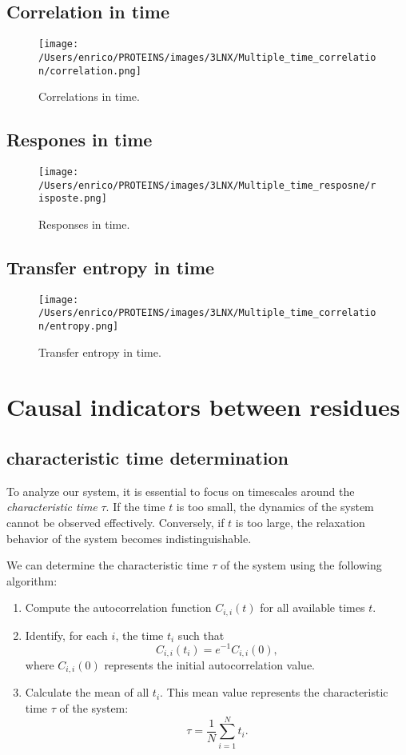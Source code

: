 \documentclass[English, Lau, oneside]{sapthesis}
\begin{document}
\subsection{Correlation in time}
\begin{figure}[h!]
    \centering
    \texttt{[image: /Users/enrico/PROTEINS/images/3LNX/Multiple\_time\_correlation/correlation.png]}    
    \caption{Correlations in time.}
\end{figure}
\subsection{Respones in time}
\begin{figure}[h!]
    \centering
    \texttt{[image: /Users/enrico/PROTEINS/images/3LNX/Multiple\_time\_resposne/risposte.png]}    
    \caption{Responses in time.}
\end{figure}
\subsection{Transfer entropy in time}
\begin{figure}[h!]
    \centering
    \texttt{[image: /Users/enrico/PROTEINS/images/3LNX/Multiple\_time\_correlation/entropy.png]}    
    \caption{Transfer entropy  in time.}
\end{figure}



\newpage
\section{Causal indicators between residues}
\subsection{characteristic time determination}
To analyze our system, it is essential to focus on timescales around the \textit{characteristic time} \(\tau\). 
If the time \(t\) is too small, the dynamics of the system cannot be observed effectively. Conversely, if \(t\) is too large, the relaxation behavior of the system becomes indistinguishable.

We can determine the characteristic time \(\tau\) of the system using the following algorithm:
\begin{enumerate}
    \item Compute the autocorrelation function \(C_{i,i}(t)\) for all available times \(t\).
    \item Identify, for each \(i\), the time \(t_i\) such that 
    \[
    C_{i,i}(t_i) = e^{-1} C_{i,i}(0),
    \]
    where \(C_{i,i}(0)\) represents the initial autocorrelation value.
    \item Calculate the mean of all \(t_i\). This mean value represents the characteristic time \(\tau\) of the system:
    \[
    \tau = \frac{1}{N} \sum_{i=1}^{N} t_i.
    \]
\end{enumerate}
\end{document}
